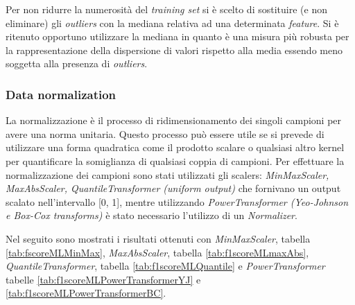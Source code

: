                         Per non ridurre la numerosità del \textit{training set} si è scelto di sostituire (e non eliminare) gli \textit{outliers} con la mediana relativa ad una determinata \textit{feature}. Si è ritenuto opportuno utilizzare la mediana in quanto è una misura più robusta per la rappresentazione della dispersione di valori rispetto alla media essendo meno soggetta alla presenza di \textit{outliers}.                        
                
                \subsubsection{Data normalization}
                
                La normalizzazione è il processo di ridimensionamento dei singoli campioni per avere una norma unitaria. Questo processo può essere utile se si prevede di utilizzare una forma quadratica come il prodotto scalare o qualsiasi altro kernel per quantificare la somiglianza di qualsiasi coppia di campioni. Per effettuare la normalizzazione dei campioni sono stati utilizzati gli scalers: \textit{MinMaxScaler, MaxAbsScaler, QuantileTransformer (uniform output)} che fornivano un output scalato nell'intervallo [0, 1], mentre utilizzando \textit{PowerTransformer (Yeo-Johnson e Box-Cox transforms)} è stato necessario l'utilizzo di un \textit{Normalizer}.
                
                Nel seguito sono mostrati i risultati ottenuti con \textit{MinMaxScaler}, tabella \ref{tab:fscoreMLMinMax}, \textit{MaxAbsScaler}, tabella \ref{tab:f1scoreMLmaxAbs}, \textit{QuantileTransformer}, tabella \ref{tab:f1scoreMLQuantile} e \textit{PowerTransformer} tabelle \ref{tab:f1scoreMLPowerTransformerYJ} e \ref{tab:f1scoreMLPowerTransformerBC}.
                
